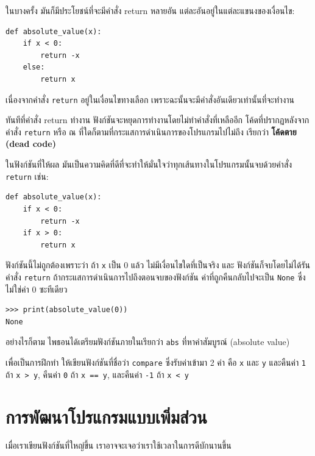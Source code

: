 ในบางครั้ง มันก็มีประโยชน์ที่จะมีคำสั่ง return หลายอัน แต่ละอันอยู่ในแต่ละแขนงของเงื่อนไข:

\begin{verbatim}
def absolute_value(x):
    if x < 0:
        return -x
    else:
        return x
\end{verbatim}
%
เนื่องจากคำสั่ง {\tt return} อยู่ในเงื่อนไขทางเลือก 
เพราะฉะนั้นจะมีคำสั่งอันเดียวเท่านั้นที่จะทำงาน

ทันทีที่คำสั่ง return ทำงาน ฟังก์ชันจะหยุดการทำงานโดยไม่ทำคำสั่งที่เหลืออีก 
โค้ดที่ปรากฏหลังจากคำสั่ง {\tt return} หรือ ณ ที่ใดก็ตามที่กระแสการดำเนินการของโปรแกรมไปไม่ถึง เรียกว่า
{\bf โค้ดตาย (dead code)}

ในฟังก์ชันที่ให้ผล มันเป็นความคิดที่ดีที่จะทำให้มั่นใจว่าทุกเส้นทางในโปรแกรมนั้นจบด้วยคำสั่ง 
{\tt return} เช่น:

\begin{verbatim}
def absolute_value(x):
    if x < 0:
        return -x
    if x > 0:
        return x
\end{verbatim}
%
ฟังก์ชันนี้ไม่ถูกต้องเพราะว่า ถ้า {\tt x} เป็น 0 แล้ว ไม่มีเงื่อนไขใดที่เป็นจริง และ
ฟังก์ชันก็จบโดยไม่ได้รันคำสั่ง {\tt return} ถ้ากระแสการดำเนินการไปถึงตอนจบของฟังก์ชัน 
ค่าที่ถูกคืนกลับไปจะเป็น {\tt None} ซึ่งไม่ใช่ค่า 0 ซะทีเดียว

\begin{verbatim}
>>> print(absolute_value(0))
None
\end{verbatim}
%
อย่างไรก็ตาม ไพธอนได้เตรียมฟังก์ชันภายในเรียกว่า {\tt abs} ที่หาค่าสัมบูรณ์ (absolute value)

เพื่อเป็นการฝึกทำ ให้เขียนฟังก์ชันที่ชื่อว่า {\tt compare} ซึ่งรับค่าเข้ามา 2 ค่า คือ {\tt x} และ {\tt y}
และคืนค่า {\tt 1} ถ้า {\tt x > y}, คืนค่า {\tt 0} ถ้า {\tt x == y}, และคืนค่า {\tt -1} ถ้า {\tt x < y}


\section{การพัฒนาโปรแกรมแบบเพิ่มส่วน} %
\label{incremental.development}

เมื่อเราเขียนฟังก์ชันที่ใหญ่ขึ้น เราอาจจะเจอว่าเราใช้เวลาในการดีบักนานขึ้น


